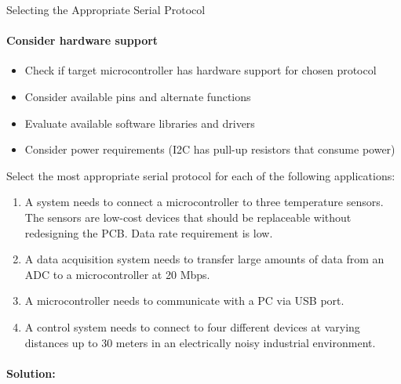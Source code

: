 \begin{KR}{Selecting the Appropriate Serial Protocol}
\paragraph{Consider hardware support}
\begin{itemize}
    \item Check if target microcontroller has hardware support for chosen protocol
    \item Consider available pins and alternate functions
    \item Evaluate available software libraries and drivers
    \item Consider power requirements (I2C has pull-up resistors that consume power)
\end{itemize}
\end{KR}

\begin{example}
Select the most appropriate serial protocol for each of the following applications:
\begin{enumerate}
    \item A system needs to connect a microcontroller to three temperature sensors. The sensors are low-cost devices that should be replaceable without redesigning the PCB. Data rate requirement is low.
    \item A data acquisition system needs to transfer large amounts of data from an ADC to a microcontroller at 20 Mbps.
    \item A microcontroller needs to communicate with a PC via USB port.
    \item A control system needs to connect to four different devices at varying distances up to 30 meters in an electrically noisy industrial environment.
\end{enumerate}
\paragraph{Solution:}


\end{example}
